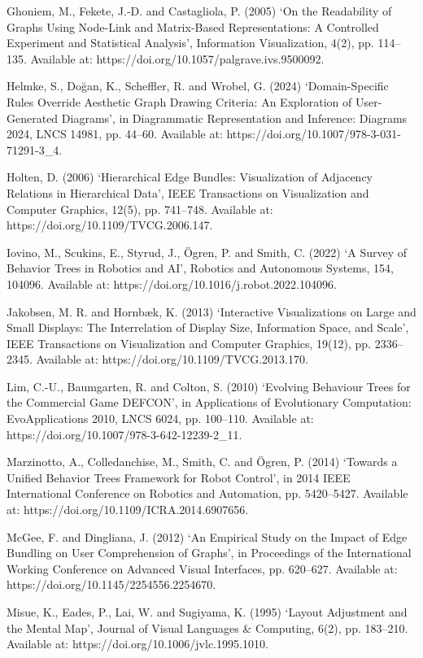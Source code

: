 \documentclass[11pt,a4paper,oneside,extrafontsizes]{memoir}
\begin{document}
Ghoniem, M., Fekete, J.-D. and Castagliola, P. (2005) ‘On the Readability of Graphs Using Node-Link and Matrix-Based Representations: A Controlled Experiment and Statistical Analysis’, Information Visualization, 4(2), pp. 114–135. Available at: https://doi.org/10.1057/palgrave.ivs.9500092.

Helmke, S., Doğan, K., Scheffler, R. and Wrobel, G. (2024) ‘Domain-Specific Rules Override Aesthetic Graph Drawing Criteria: An Exploration of User-Generated Diagrams’, in Diagrammatic Representation and Inference: Diagrams 2024, LNCS 14981, pp. 44–60. Available at: https://doi.org/10.1007/978-3-031-71291-3\_4.

Holten, D. (2006) ‘Hierarchical Edge Bundles: Visualization of Adjacency Relations in Hierarchical Data’, IEEE Transactions on Visualization and Computer Graphics, 12(5), pp. 741–748. Available at: https://doi.org/10.1109/TVCG.2006.147.

Iovino, M., Scukins, E., Styrud, J., Ögren, P. and Smith, C. (2022) ‘A Survey of Behavior Trees in Robotics and AI’, Robotics and Autonomous Systems, 154, 104096. Available at: https://doi.org/10.1016/j.robot.2022.104096.

Jakobsen, M. R. and Hornbæk, K. (2013) ‘Interactive Visualizations on Large and Small Displays: The Interrelation of Display Size, Information Space, and Scale’, IEEE Transactions on Visualization and Computer Graphics, 19(12), pp. 2336–2345. Available at: https://doi.org/10.1109/TVCG.2013.170.

Lim, C.-U., Baumgarten, R. and Colton, S. (2010) ‘Evolving Behaviour Trees for the Commercial Game DEFCON’, in Applications of Evolutionary Computation: EvoApplications 2010, LNCS 6024, pp. 100–110. Available at: https://doi.org/10.1007/978-3-642-12239-2\_11.

Marzinotto, A., Colledanchise, M., Smith, C. and Ögren, P. (2014) ‘Towards a Unified Behavior Trees Framework for Robot Control’, in 2014 IEEE International Conference on Robotics and Automation, pp. 5420–5427. Available at: https://doi.org/10.1109/ICRA.2014.6907656.

McGee, F. and Dingliana, J. (2012) ‘An Empirical Study on the Impact of Edge Bundling on User Comprehension of Graphs’, in Proceedings of the International Working Conference on Advanced Visual Interfaces, pp. 620–627. Available at: https://doi.org/10.1145/2254556.2254670.

Misue, K., Eades, P., Lai, W. and Sugiyama, K. (1995) ‘Layout Adjustment and the Mental Map’, Journal of Visual Languages \& Computing, 6(2), pp. 183–210. Available at: https://doi.org/10.1006/jvlc.1995.1010.
\end{document}
